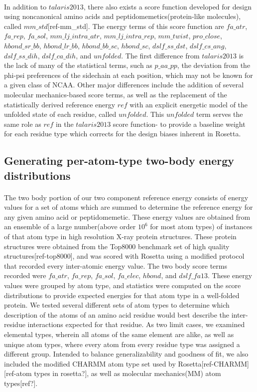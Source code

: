 \paragraph{}
In addition to $talaris2013$, there also exists a score function developed for design using noncanonical amino acids and peptidomemetics(protein-like molecules), called $mm\_std$[ref-mm\_std].
The energy terms of this score function are $fa\_atr$, $fa\_rep$, $fa\_sol$, $mm\_lj\_intra\_atr$, $mm\_lj\_intra\_rep$, $mm\_twist$, $pro\_close$, $hbond\_sr\_bb$, $hbond\_lr\_bb$, $hbond\_bb\_sc$, $hbond\_sc$, $dslf\_ss\_dst$, $dslf\_cs\_ang$, $dslf\_ss\_dih$, $dslf\_ca\_dih$, and $unfolded$.
The first difference from $talaris2013$ is the lack of many of the statistical terms, such as $p\_aa\_pp$, the deviation from the phi-psi preferences of the sidechain at each position, which may not be known for a given class of NCAA.
Other major differences include the addition of several molecular mechanics-based score terms, as well as the replacement of the statistically derived reference energy $ref$ with an explicit energetic model of the unfolded state of each residue, called $unfolded$.
This $unfolded$ term serves the same role as $ref$ in the $talaris2013$ score function- to provide a baseline weight for each residue type which corrects for the design biases inherent in Rosetta.


\subsection{Generating per-atom-type two-body energy distributions}
\paragraph{}
The two body portion of our two component reference energy consists of energy values for a set of atoms which are summed to determine the reference energy for any given amino acid or peptidomemetic.
These energy values are obtained from an ensemble of a large number(above order $10^6$ for most atom types) of instances of that atom type in high resolution X-ray protein structures.
These protein structures were obtained from the Top8000 benchmark set of high quality structures[ref-top8000], and was scored with Rosetta using a modified protocol that recorded every inter-atomic energy value.
The two body score terms recorded were $fa\_atr$, $fa\_rep$, $fa\_sol$, $fa\_elec$, $hbond$, and $dslf\_fa13$.
These energy values were grouped by atom type, and statistics were computed on the score distributions to provide expected energies for that atom type in a well-folded protein.
We tested several different sets of atom types to determine which description of the atoms of an amino acid residue would best describe the inter-residue interactions expected for that residue.
As two limit cases, we examined elemental types, wherein all atoms of the same element are alike, as well as unique atom types, where every atom from every residue type was assigned a different group.
Intended to balance generalizability and goodness of fit, we also included the modified CHARMM atom type set used by Rosetta[ref-CHARMM][ref-atom types in rosetta?], as well as molecular mechanics(MM) atom types[ref?].


